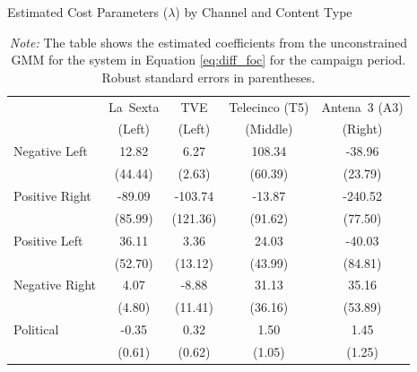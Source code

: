 \documentclass[12pt]{article}
\begin{document}
	\begin{table}[!htbp]
		\caption{Estimated Cost Parameters ($\lambda$) by Channel and Content Type}
		\label{tab:costs}
		\centering\small
		\begin{tabular}{lcccc}
			\toprule
			& La~Sexta & TVE & Telecinco (T5) & Antena~3 (A3)\\
			& \scriptsize{(Left)} & \scriptsize{(Left)} & \scriptsize{(Middle)} & \scriptsize{(Right)}\\
			\midrule
			Negative Left & 12.82 & 6.27 & 108.34 & -38.96 \\
			& (44.44) & (2.63) & (60.39) & (23.79) \\
			\midrule
			Positive Right & -89.09 & -103.74 & -13.87 & -240.52 \\
			& (85.99) & (121.36) & (91.62) & (77.50) \\
			\midrule
			Positive Left & 36.11 & 3.36 & 24.03 & -40.03 \\
			& (52.70) & (13.12) & (43.99) & (84.81) \\
			\midrule
			Negative Right & 4.07 & -8.88 & 31.13 & 35.16 \\
			& (4.80) & (11.41) & (36.16) & (53.89) \\
			\midrule
			Political & -0.35 & 0.32 & 1.50 & 1.45 \\
			& (0.61) & (0.62) & (1.05) & (1.25) \\
			\midrule
			\bottomrule
		\end{tabular}
		\vspace{0.5em}
		\caption*{\small \emph{Note:} The table shows the estimated coefficients from the unconstrained GMM for the system in Equation \eqref{eq:diff_foc} for the campaign period. Robust standard errors in parentheses. }
	\end{table}
	
	
	
	
	
	
	
	
	
	
	
	
	
\end{document}
